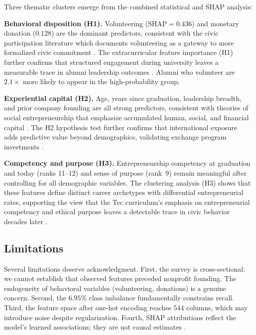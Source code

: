 \documentclass[10pt,twocolumn]{article}
\begin{document}
Three thematic clusters emerge from the combined statistical and SHAP analysis:

\textbf{Behavioral disposition (H1).} Volunteering ($\text{SHAP} = 0.436$) and
monetary donation ($0.128$) are the dominant predictors, consistent with the
civic participation literature which documents volunteering as a gateway to more
formalized civic commitment \cite{schmid2025}. The extracurricular feature
importance (H1) further confirms that structured engagement during university
leaves a measurable trace in alumni leadership outcomes \cite{binani2024,
lamhour2026}. Alumni who volunteer are $2.1\times$ more likely to appear in the
high-probability group.

\textbf{Experiential capital (H2).} Age, years since graduation, leadership
breadth, and prior company founding are all strong predictors, consistent with
theories of social entrepreneurship that emphasize accumulated human, social,
and financial capital \cite{modem2021}. The H2 hypothesis test further confirms
that international exposure adds predictive value beyond demographics, validating
exchange program investments \cite{maltseva2022, udayar2025}.

\textbf{Competency and purpose (H3).} Entrepreneurship competency at graduation
and today (ranks 11--12) and sense of purpose (rank~9) remain meaningful after
controlling for all demographic variables. The clustering analysis (H3) shows
that these features define distinct career archetypes with differential
entrepreneurial rates, supporting the view that the Tec curriculum's emphasis
on entrepreneurial competency and ethical purpose leaves a detectable trace in
civic behavior decades later \cite{oliveira2020, sullivan2021}.

\subsection{Limitations}

Several limitations deserve acknowledgment. First, the survey is
cross-sectional: we cannot establish that observed features preceded nonprofit
founding. The endogeneity of behavioral variables (volunteering, donations) is a
genuine concern. Second, the $6.95\%$ class imbalance fundamentally constrains
recall. Third, the feature space after one-hot encoding reaches 544 columns,
which may introduce noise despite regularization. Fourth, SHAP attributions
reflect the model's learned associations; they are not causal estimates
\cite{raju2026, shannaq2025}.
\end{document}
